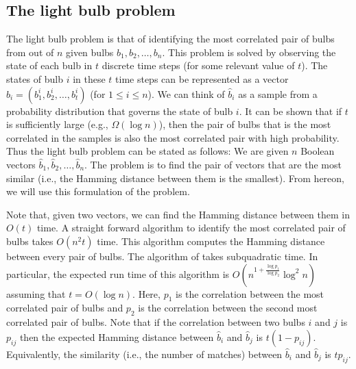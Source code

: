 \documentclass{article}
\theoremstyle{definition}
\theoremstyle{remark}
\begin{document}
\subsection{The light bulb problem}
The light bulb problem is that of identifying the most correlated pair of bulbs from out of $n$ given bulbs \newline $b_1,b_2,\ldots,b_n$. This problem is solved by observing the state of each bulb in $t$ discrete time steps (for some relevant value of $t$). The states of bulb $i$ in these $t$ time steps can be represented as a vector $\hat{b}_i=(b_1^i,b_2^i,\ldots,b_t^i)$ (for $1\leq i\leq n$). We can think of $\hat{b}_i$ as a sample from a probability distribution that governs the state of bulb $i$. It can be shown that if $t$ is sufficiently large (e.g., $\Omega(\log n)$), then the pair of bulbs that is the most correlated in the samples is also the most correlated pair with high probability. Thus the light bulb problem can be stated as follows: We are given $n$ Boolean vectors $\hat{b}_1,\hat{b}_2,\ldots,\hat{b}_n$. The problem is to find the pair of vectors that are the most similar (i.e., the Hamming distance between them is the smallest). From hereon, we will use this formulation of the problem.

   Note that, given two vectors, we can find the Hamming distance between them in $O(t)$ time. A straight forward algorithm to identify the most correlated pair of bulbs takes $O(n^2t)$ time. This algorithm computes the Hamming distance between every pair of bulbs. The algorithm of \cite{RSJ89} takes subquadratic time. In particular, the expected run time of this algorithm is \newline $O\left (n^{1+\frac{\log p_1}{\log p_2}}\log^2n\right )$ assuming that $t=O(\log n)$. Here, $p_1$ is the correlation between the most correlated pair of bulbs and $p_2$ is the correlation between the second most correlated pair of bulbs. Note that if the correlation between two bulbs $i$ and $j$ is $p_{ij}$ then the expected Hamming distance between $\hat{b}_i$ and $\hat{b}_j$ is $t(1-p_{ij})$. Equivalently, the similarity (i.e., the number of matches) between $\hat{b}_i$ and $\hat{b}_j$ is $tp_{ij}$.
\end{document}
